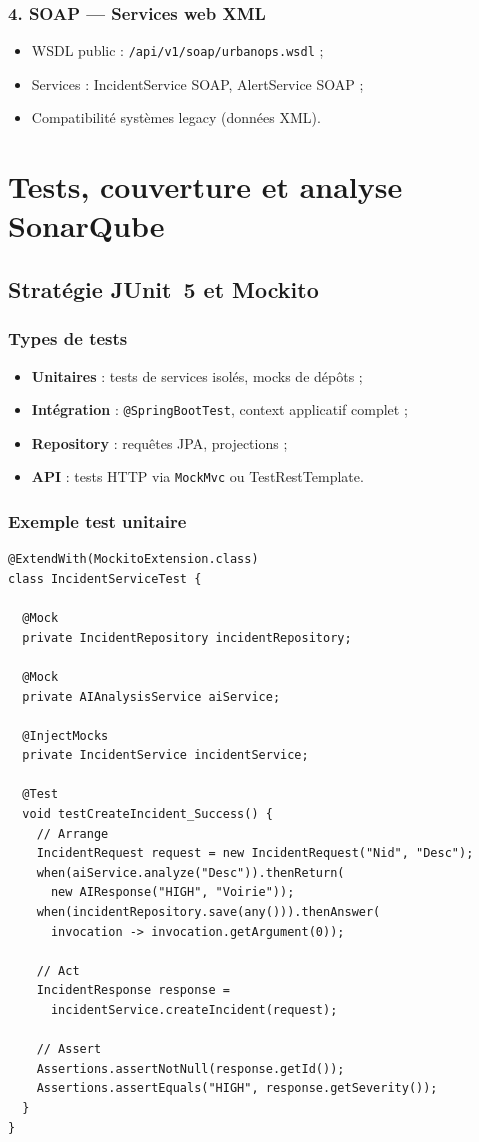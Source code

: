 \documentclass[12pt,a4paper,twoside,openright]{book}
\begin{document}
\subsection{4. SOAP — Services web XML}
\begin{itemize}
  \item WSDL public : \texttt{/api/v1/soap/urbanops.wsdl} ;
  \item Services : IncidentService SOAP, AlertService SOAP ;
  \item Compatibilité systèmes legacy (données XML).
\end{itemize}

\chapter{Tests, couverture et analyse SonarQube}
\label{chap:tests}

\section{Stratégie JUnit~5 et Mockito}

\subsection{Types de tests}
\begin{itemize}
  \item \textbf{Unitaires} : tests de services isolés, mocks de dépôts ;
  \item \textbf{Intégration} : \texttt{@SpringBootTest}, context applicatif complet ;
  \item \textbf{Repository} : requêtes JPA, projections ;
  \item \textbf{API} : tests HTTP via \texttt{MockMvc} ou TestRestTemplate.
\end{itemize}

\subsection{Exemple test unitaire}
\begin{lstlisting}[style=javaurban,caption={Test JUnit5 — IncidentService.createIncident().},label=lst:junit5]
@ExtendWith(MockitoExtension.class)
class IncidentServiceTest {

  @Mock
  private IncidentRepository incidentRepository;

  @Mock
  private AIAnalysisService aiService;

  @InjectMocks
  private IncidentService incidentService;

  @Test
  void testCreateIncident_Success() {
    // Arrange
    IncidentRequest request = new IncidentRequest("Nid", "Desc");
    when(aiService.analyze("Desc")).thenReturn(
      new AIResponse("HIGH", "Voirie"));
    when(incidentRepository.save(any())).thenAnswer(
      invocation -> invocation.getArgument(0));

    // Act
    IncidentResponse response =
      incidentService.createIncident(request);

    // Assert
    Assertions.assertNotNull(response.getId());
    Assertions.assertEquals("HIGH", response.getSeverity());
  }
}
\end{lstlisting}
\end{document}
